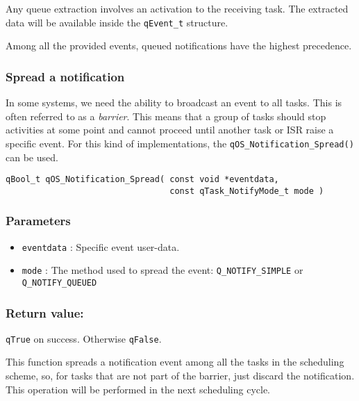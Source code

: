 

\begin{tcolorbox}
\HandRight Any queue extraction involves an activation to the receiving task. The extracted data will be available inside the \lstinline{qEvent_t} structure.
\end{tcolorbox}

\begin{tcolorbox}
\HandRight Among all the provided events, queued notifications have the highest precedence.
\end{tcolorbox}


\subsubsection{Spread a notification}
In some systems, we need the ability to broadcast an event to all tasks. This is often referred to as a \textit{barrier}. This means that a group of tasks should stop activities at some point and cannot proceed until another task or ISR raise a specific event. 
For this kind of implementations, the \lstinline{qOS_Notification_Spread()}  can be used. 
\medskip
\begin{lstlisting}[style=CStyle]
qBool_t qOS_Notification_Spread( const void *eventdata, 
                                 const qTask_NotifyMode_t mode )
\end{lstlisting}

\subsubsection*{Parameters}
\begin{itemize}
    \item \lstinline{eventdata} : Specific event user-data. 
    \item \lstinline{mode} : The method used to spread the event: \lstinline{Q_NOTIFY_SIMPLE} or \lstinline{Q_NOTIFY_QUEUED}
\end{itemize}

\subsubsection*{Return value:}

\lstinline{qTrue} on success. Otherwise \lstinline{qFalse}.

\noindent\hrulefill
\medskip

\begin{tcolorbox}
\HandRight This function spreads a notification event among all the tasks in the scheduling scheme, so,  for tasks that are not part of the barrier, just discard the notification. This operation will be performed in the next scheduling cycle.
\end{tcolorbox}

